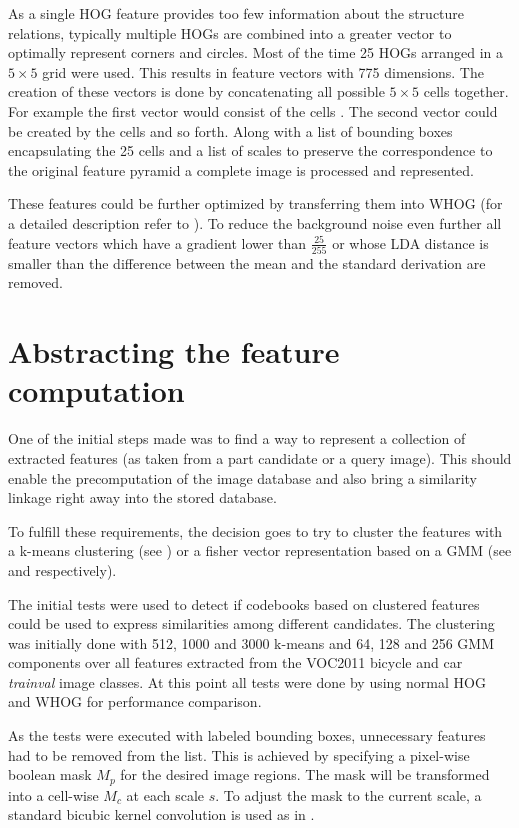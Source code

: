 As a single \ac{HOG} feature provides too few information about the structure relations, typically multiple \acp{HOG} are combined into a greater vector to optimally represent corners and circles. Most of the time 25 \acp{HOG} arranged in a $5\times5$ grid were used. This results in feature vectors with 775 dimensions. The creation of these vectors is done by concatenating all possible $5\times5$ cells together. For example the first vector would consist of the cells . The second vector could be created by the cells  and so forth. Along with a list of bounding boxes encapsulating the 25 cells and a list of scales to preserve the correspondence to the original feature pyramid a complete image is processed and represented.
\par
These features could be further optimized by transferring them into \ac{WHOG} (for a detailed description refer to ). To reduce the background noise even further all feature vectors which have a gradient lower than $\frac{25}{255}$ or whose \ac{LDA} distance is smaller than the difference between the mean and the standard derivation are removed.

\section{Abstracting the feature computation}

One of the initial steps made was to find a way to represent a collection of extracted features (as taken from a part candidate or a query image). This should enable the precomputation of the image database and also bring a similarity linkage right away into the stored database.

To fulfill these requirements, the decision goes to try to cluster the features with a k-means clustering (see ) or a fisher vector representation based on a \acf{GMM} (see  and  respectively).
\par
The initial tests were used to detect if codebooks based on clustered features could be used to express similarities among different candidates.
The clustering was initially done with 512, 1000 and 3000 k-means and 64, 128 and 256 \ac{GMM} components over all features extracted from the \ac{VOC2011} bicycle and car \textit{trainval} image classes.
At this point all tests were done by using normal \ac{HOG} and \acl{WHOG} for performance comparison.
\par
As the tests were executed with labeled bounding boxes, unnecessary features had to be removed from the list. This is achieved by specifying a pixel-wise boolean mask $M_p$ for the desired image regions. The mask will be transformed into a cell-wise $M_c$ at each scale $s$. To adjust the mask to the current scale, a standard bicubic kernel convolution is used as in .


